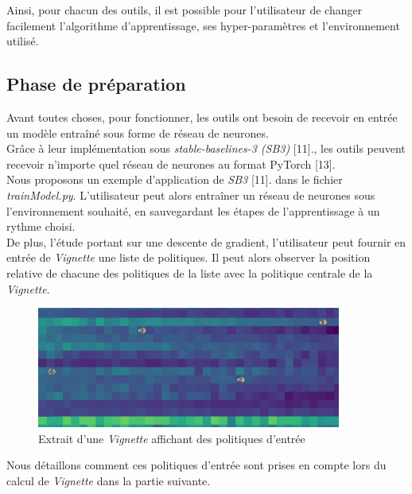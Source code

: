 \documentclass[12pt]{article}
\begin{document}
Ainsi, pour chacun des outils, il est possible pour l’utilisateur de changer facilement l’algorithme d’apprentissage, ses hyper-paramètres et l’environnement utilisé. \\

\subsection{Phase de préparation}

Avant toutes choses, pour fonctionner, les outils ont besoin de recevoir en entrée un modèle entraîné sous forme de réseau de neurones. \\

Grâce à leur implémentation sous \emph{stable-baselines-3 (SB3)} [11]., les outils peuvent recevoir n'importe quel réseau de neurones au format PyTorch [13]. \\

Nous proposons un exemple d'application de \emph{SB3} [11].
 dans le fichier \emph{trainModel.py}. L'utilisateur peut alors entraîner un réseau de neurones sous l'environnement souhaité, en sauvegardant les étapes de l'apprentissage à un rythme choisi. \\

De plus, l'étude portant sur une descente de gradient, l'utilisateur peut fournir en entrée de \emph{Vignette} une liste de politiques. Il peut alors observer la position relative de chacune des politiques de la liste avec la politique centrale de la \emph{Vignette}. \\

\begin{figure}[htp]
    \centering
    \includegraphics[width=10cm]{Images/politiques_entrees_vignette}
    \caption{Extrait d'une \emph{Vignette} affichant des politiques d'entrée}
    \label{fig:exempleEntree}
\end{figure}

Nous détaillons comment ces politiques d'entrée sont prises en compte lors du calcul de \emph{Vignette} dans la partie suivante. \\
\end{document}
